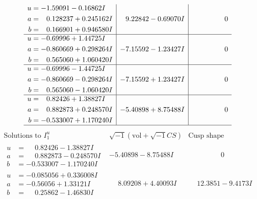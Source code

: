 \documentclass[1p]{elsarticle_modified}
\theoremstyle{definition}
\newcommand{\I}{\sqrt{-1}}
\begin{document}
$$\begin{array}{c|c|c}
\begin{aligned}
u &= -1.59091 - 0.16862 I \\
a &= \phantom{-}0.128237 + 0.245162 I \\
b &= \phantom{-}0.166901 + 0.946580 I\end{aligned}
 & \phantom{-}9.22842 - 0.69070 I & \phantom{-0.000000 } 0 \\ \hline\begin{aligned}
u &= -0.69996 + 1.44725 I \\
a &= -0.860669 + 0.298264 I \\
b &= \phantom{-}0.565060 + 1.060420 I\end{aligned}
 & -7.15592 - 1.23427 I & \phantom{-0.000000 } 0 \\ \hline\begin{aligned}
u &= -0.69996 - 1.44725 I \\
a &= -0.860669 - 0.298264 I \\
b &= \phantom{-}0.565060 - 1.060420 I\end{aligned}
 & -7.15592 + 1.23427 I & \phantom{-0.000000 } 0 \\ \hline\begin{aligned}
u &= \phantom{-}0.82426 + 1.38827 I \\
a &= \phantom{-}0.882873 + 0.248570 I \\
b &= -0.533007 + 1.170240 I\end{aligned}
 & -5.40898 + 8.75488 I & \phantom{-0.000000 } 0\\
 \hline 
 \end{array}$$\newpage$$\begin{array}{c|c|c}  
\text{Solutions to }I^u_{1}& \I (\text{vol} + \sqrt{-1}CS) & \text{Cusp shape}\\
 \hline 
\begin{aligned}
u &= \phantom{-}0.82426 - 1.38827 I \\
a &= \phantom{-}0.882873 - 0.248570 I \\
b &= -0.533007 - 1.170240 I\end{aligned}
 & -5.40898 - 8.75488 I & \phantom{-0.000000 } 0 \\ \hline\begin{aligned}
u &= -0.085056 + 0.336008 I \\
a &= -0.56056 + 1.33121 I \\
b &= \phantom{-}0.25862 - 1.46830 I\end{aligned}
 & \phantom{-}8.09208 + 4.40093 I & \phantom{-}12.3851 - 9.4173 I \\ \hline\begin{aligned}

\end{aligned}
\end{array}$$
\end{document}
